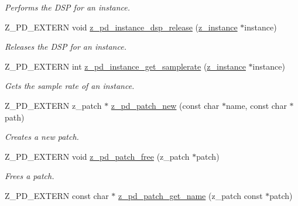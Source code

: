 \begin{DoxyCompactItemize}
\begin{DoxyCompactList}\small\item\em Performs the D\-S\-P for an instance. \end{DoxyCompactList}\item 
\hypertarget{group__zpd_gaab8d607bc3be625e9a25099c9645e053}{Z\-\_\-\-P\-D\-\_\-\-E\-X\-T\-E\-R\-N void \hyperlink{group__zpd_gaab8d607bc3be625e9a25099c9645e053}{z\-\_\-pd\-\_\-instance\-\_\-dsp\-\_\-release} (\hyperlink{struct__instance}{z\-\_\-instance} $\ast$instance)}\label{group__zpd_gaab8d607bc3be625e9a25099c9645e053}

\begin{DoxyCompactList}\small\item\em Releases the D\-S\-P for an instance. \end{DoxyCompactList}\item 
\hypertarget{group__zpd_ga8839b9cb9ff1f66239ca7db94e91bc68}{Z\-\_\-\-P\-D\-\_\-\-E\-X\-T\-E\-R\-N int \hyperlink{group__zpd_ga8839b9cb9ff1f66239ca7db94e91bc68}{z\-\_\-pd\-\_\-instance\-\_\-get\-\_\-samplerate} (\hyperlink{struct__instance}{z\-\_\-instance} $\ast$instance)}\label{group__zpd_ga8839b9cb9ff1f66239ca7db94e91bc68}

\begin{DoxyCompactList}\small\item\em Gets the sample rate of an instance. \end{DoxyCompactList}\item 
\hypertarget{group__zpd_gadee62079ea926216d2a59838c9dad43b}{Z\-\_\-\-P\-D\-\_\-\-E\-X\-T\-E\-R\-N z\-\_\-patch $\ast$ \hyperlink{group__zpd_gadee62079ea926216d2a59838c9dad43b}{z\-\_\-pd\-\_\-patch\-\_\-new} (const char $\ast$name, const char $\ast$path)}\label{group__zpd_gadee62079ea926216d2a59838c9dad43b}

\begin{DoxyCompactList}\small\item\em Creates a new patch. \end{DoxyCompactList}\item 
\hypertarget{group__zpd_ga21f60179ccd2eebd1221c955b60639c8}{Z\-\_\-\-P\-D\-\_\-\-E\-X\-T\-E\-R\-N void \hyperlink{group__zpd_ga21f60179ccd2eebd1221c955b60639c8}{z\-\_\-pd\-\_\-patch\-\_\-free} (z\-\_\-patch $\ast$patch)}\label{group__zpd_ga21f60179ccd2eebd1221c955b60639c8}

\begin{DoxyCompactList}\small\item\em Frees a patch. \end{DoxyCompactList}\item 
\hypertarget{group__zpd_ga9c9c9c6e04a8a219f6d27f6fad431875}{Z\-\_\-\-P\-D\-\_\-\-E\-X\-T\-E\-R\-N const char $\ast$ \hyperlink{group__zpd_ga9c9c9c6e04a8a219f6d27f6fad431875}{z\-\_\-pd\-\_\-patch\-\_\-get\-\_\-name} (z\-\_\-patch const $\ast$patch)}\label{group__zpd_ga9c9c9c6e04a8a219f6d27f6fad431875}


\end{DoxyCompactItemize}
